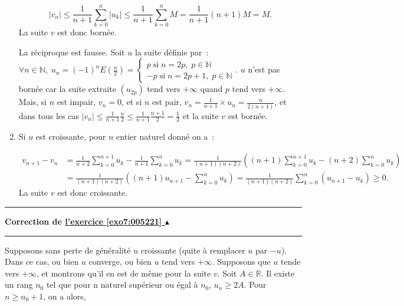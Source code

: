 \documentclass[11pt,a4paper]{article}
\newcommand{\Nn}{\mathbb{N}} \newcommand{\N}{\mathbb{N}}
\newcommand{\Rr}{\mathbb{R}} \newcommand{\R}{\mathbb{R}}
\newcounter{exo}
\newcommand{\correction}[1]{\hypertarget{cor7:#1}{}\label{cor7:#1}{\bf Correction de \hyperlink{exo7:#1}{l'exercice \ref{exo7:#1} $\blacktriangle$}}\vspace{1mm}\hrule\vspace{1mm}}
\newcommand{\fincorrection}{\vspace{1mm}\hrule\vspace*{7mm}}
\begin{document}
\begin{enumerate}
$$|v_n|\leq\frac{1}{n+1}\sum_{k=0}^{n}|u_k|\leq\frac{1}{n+1}\sum_{k=0}^{n}M=\frac{1}{n+1}(n+1)M=M.$$
La suite $v$ est donc bornée.

\begin{center}
\end{center}
La réciproque est fausse. Soit $u$ la suite définie par~:~$\forall n\in\Nn,\;u_n=(-1)^nE\left(\frac{n}{2}\right)=
\left\{
\begin{array}{l}
p\;\mbox{si}\;n=2p,\;p\in\Nn\\
-p\;\mbox{si}\;n=2p+1,\;p\in\Nn
\end{array}
\right.$.
$u$ n'est pas bornée car la suite extraite $(u_{2p})$ tend vers $+\infty$ quand $p$ tend vers $+\infty$. 
Mais, si $n$ est impair, $v_n=0$, et si $n$ est pair, $v_n=\frac{1}{n+1}\times u_n=\frac{n}{2(n+1)}$, et dans tous les cas $|v_n|\leq\frac{1}{n+1}\frac{n}{2}\leq\frac{1}{n+1}\frac{n+1}{2}=\frac{1}{2}$ et la suite $v$ est bornée.
 \item  Si $u$ est croissante, pour $n$ entier naturel donné on a~:

\begin{align*}
v_{n+1}-v_n&=\frac{1}{n+2}\sum_{k=0}^{n+1}u_k-\frac{1}{n+1}\sum_{k=0}^{n}u_k=\frac{1}{(n+1)(n+2)}\left((n+1)\sum_{k=0}^{n+1}u_k-(n+2)\sum_{k=0}^{n}u_k\right)\\
 &=\frac{1}{(n+1)(n+2)}\left((n+1)u_{n+1}-\sum_{k=0}^{n}u_k\right)=\frac{1}{(n+1)(n+2)}\sum_{k=0}^{n}(u_{n+1}-u_k)\geq0.
\end{align*}
La suite $v$ est donc croissante.

\begin{center}
\end{center}
\end{enumerate}
\fincorrection
\correction{005221}
Supposons sans perte de généralité $u$ croissante (quite à remplacer $u$ par $-u$).
Dans ce cas, ou bien $u$ converge, ou bien $u$ tend vers $+\infty$.
Supposons que $u$ tende vers $+\infty$, et montrons qu'il en est de même pour la suite $v$.
Soit $A\in\Rr$. Il existe un rang $n_0$ tel que pour n naturel supérieur ou égal à $n_0$, $u_n\geq2A$.
Pour $n\geq n_0+1$, on a alors,
\end{document}
